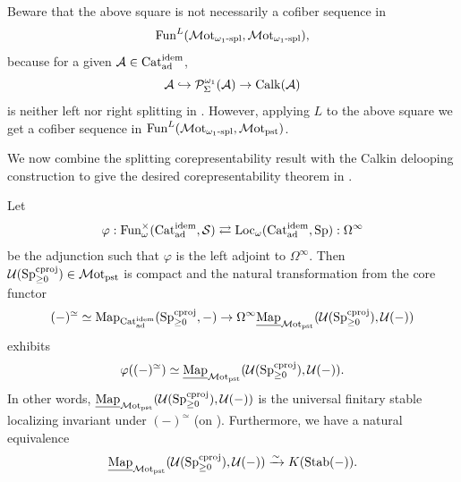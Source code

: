 \documentclass[a4paper,10pt, oneside]{amsart}
\begin{document}
\begin{rem}
	Beware that the above square is not necessarily a cofiber sequence in $$\funct^L(\motomegaonespl,\motomegaonespl),$$ because for a given $\mca \in \catadidem$,  
	$$\mca \hookrightarrow \mcp_{\Sigma}^{\omega_1}(\mca)\to \calk(\mca)$$ is neither left nor right splitting in \catadidem. However, applying $L$ to the above square we get a cofiber sequence in $\funct^L(\motomegaonespl,\motpst)$.
\end{rem}
We now combine the splitting corepresentability result with the Calkin
delooping construction to give the desired
corepresentability theorem in \motpst.
\begin{thm}\label{main4}
	Let $$\varphi: \funct^{\times}_\omega(\catadidem,\mcs)\rightleftarrows \Loc_\omega(\catadidem,\opsp) : \Omega^\infty$$ be the adjunction such that $\varphi$ is the left adjoint to $\Omega^\infty$. Then $\mcu(\spgeqcproj)\in \motpst$ is compact and the natural transformation from the core functor %
	$$(-)^\simeq\simeq \mapp_{\catadidem}(\spgeqcproj,-)\to \Omega^\infty \unmap_{\motpst}(\mcu(\spgeqcproj),\mcu(-))$$  exhibits $$\varphi((-)^\simeq)\simeq \unmap_{\motpst}(\mcu(\spgeqcproj),\mcu(-)).$$
	In other words, $\unmap_{\motpst}(\mcu(\spgeqcproj),\mcu(-))$ is the universal finitary stable localizing invariant under $(-)^\simeq$ (on \catadidem). Furthermore, we have a natural equivalence $$\unmap_{\motpst}(\mcu(\spgeqcproj),\mcu(-))\xrightarrow{\sim} K(\op{Stab}(-)).$$
\end{thm}
\end{document}

